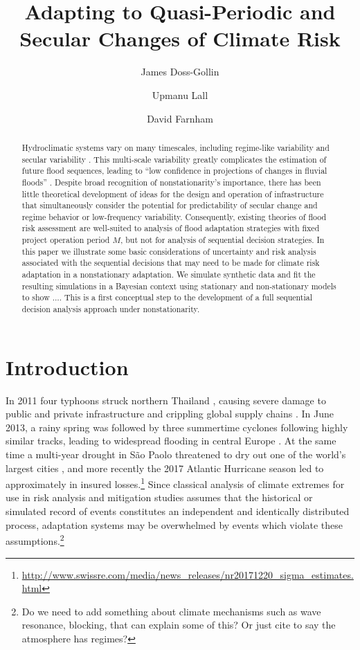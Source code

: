 \documentclass[12pt]{article}
\title{Adapting to Quasi-Periodic and Secular Changes of Climate Risk}
\author[1,2]{James Doss-Gollin}
\author[1,2]{Upmanu Lall}
\author[1,2]{David Farnham}
\affil[1]{Columbia Water Center, Columbia University}
\affil[2]{Department of Earth and Environmental Engineering, Columbia University}
\begin{document}
\maketitle
\RaggedRight{}
\begin{abstract}
  Hydroclimatic systems vary on many timescales, including regime-like variability and secular variability  \citep[``nonstationarity'';][]{Milly2008,Merz2014,Hodgkins2017}.
  This multi-scale variability greatly complicates the estimation of future flood sequences, leading to ``low confidence in projections of changes in fluvial floods'' \citep{IPCC2012}.
  Despite broad recognition of nonstationarity's importance, there has been little theoretical development of ideas for the design and operation of infrastructure that simultaneously consider the potential for predictability of secular change and regime behavior or low-frequency variability.
  Consequently, existing theories of flood risk assessment are well-suited to analysis of flood adaptation strategies with fixed project operation period $M$, but not for analysis of sequential decision strategies.
  In this paper we illustrate some basic considerations of uncertainty and risk analysis associated with the sequential decisions that may need to be made for climate risk adaptation in a nonstationary adaptation.
  We simulate synthetic data and fit the resulting simulations in a Bayesian context using stationary and non-stationary models to show \(\ldots{}\).
  This is a first conceptual step to the development of a full sequential decision analysis approach under nonstationarity.
\end{abstract}


\section{Introduction}

In 2011 four typhoons struck northern Thailand \citep{Gale2013}, causing severe damage to public and private infrastructure and crippling global supply chains \citep{Haraguchi2015}.
In June 2013, a rainy spring was followed by three summertime cyclones following highly similar tracks, leading to widespread flooding in central Europe \citep{Grams2014}.
At the same time a multi-year drought in S\~ao Paolo threatened to dry out one of the world's largest cities \citep{Seth2015}, and more recently the 2017 Atlantic Hurricane season led to approximately  in insured losses.\footnote{\url{http://www.swissre.com/media/news_releases/nr20171220_sigma_estimates.html}}
Since classical analysis of climate extremes for use in risk analysis and mitigation studies assumes that  the historical or simulated record of events constitutes an independent and identically distributed process, adaptation systems may be overwhelmed by events which violate these assumptions.\footnote{Do we need to add something about climate mechanisms such as wave resonance, blocking, \etc{} that can explain some of this? Or just cite \citet{Hannachi2017} to say the atmosphere has regimes?}
\end{document}

